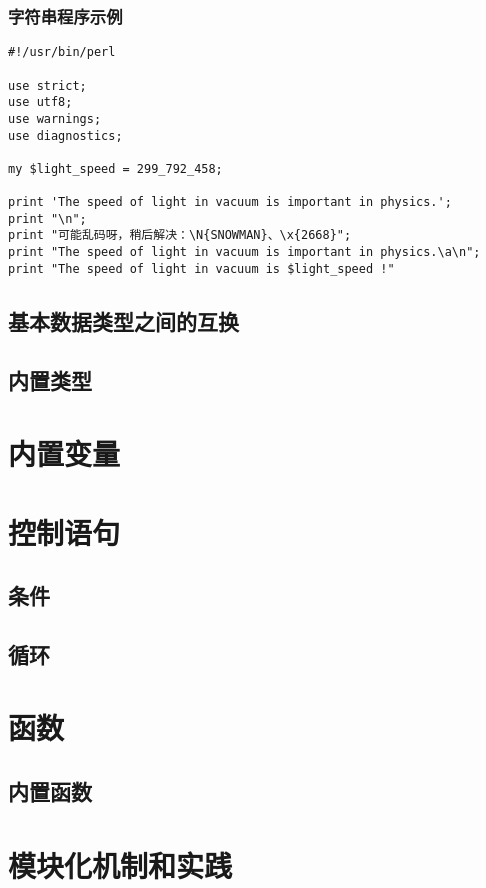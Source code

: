 \documentclass[11pt]{book}
\begin{document}
			\subsection{字符串程序示例}
\lstset{language=Perl} 
\begin{lstlisting}
#!/usr/bin/perl

use strict;
use utf8;
use warnings;
use diagnostics;

my $light_speed = 299_792_458;

print 'The speed of light in vacuum is important in physics.';
print "\n";
print "可能乱码呀，稍后解决：\N{SNOWMAN}、\x{2668}";
print "The speed of light in vacuum is important in physics.\a\n";
print "The speed of light in vacuum is $light_speed !"
\end{lstlisting}
		
		\section{基本数据类型之间的互换}
		\section{内置类型}
		
	\chapter{内置变量}
	
	\chapter{控制语句}
		\section{条件}
		\section{循环}
		
	\chapter{函数}
		\section{内置函数}
		
	\chapter{模块化机制和实践}
	
\end{document}
